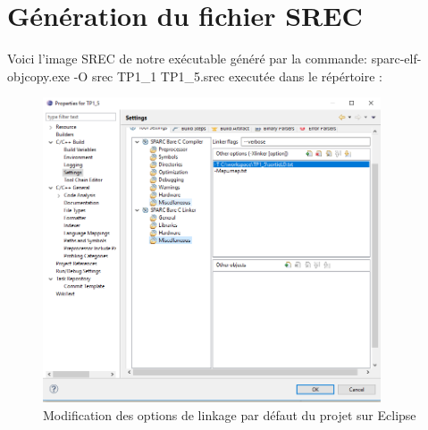 \documentclass[12pt,a4paper]{article}
\begin{document}
\section{Génération du fichier SREC}
Voici l'image SREC de notre exécutable généré par la commande:\newline
sparc-elf-objcopy.exe -O srec TP1\_1 TP1\_5.srec \newline
executée dans le répértoire :
\begin{figure}[H]
\includegraphics[width=10cm]{Capture} 

\caption{Modification des options de linkage par défaut du projet sur Eclipse}
	\end{figure}
\end{document}
